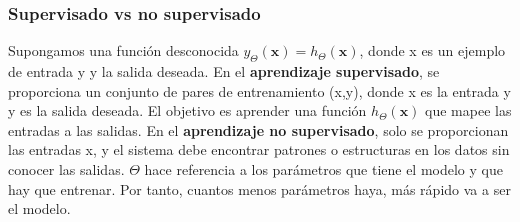 \subsubsection{Supervisado vs no supervisado}
Supongamos una función desconocida $y_{\Theta}(\mathrm{\textbf{x}}) = h_{\Theta}(\mathrm{\textbf{x}})$, donde x es un ejemplo de entrada y y la salida deseada. En el \textbf{aprendizaje supervisado}, se proporciona un conjunto de pares de entrenamiento (x,y), donde x es la entrada y y es la salida deseada. El objetivo es aprender una función $h_{\Theta}(\mathrm{\textbf{x}})$ que mapee las entradas a las salidas. En el \textbf{aprendizaje no supervisado}, solo se proporcionan las entradas x, y el sistema debe encontrar patrones o estructuras en los datos sin conocer las salidas. $\Theta$ hace referencia a los parámetros que tiene el modelo y que hay que entrenar. Por tanto, cuantos menos parámetros haya, más rápido va a ser el modelo.

